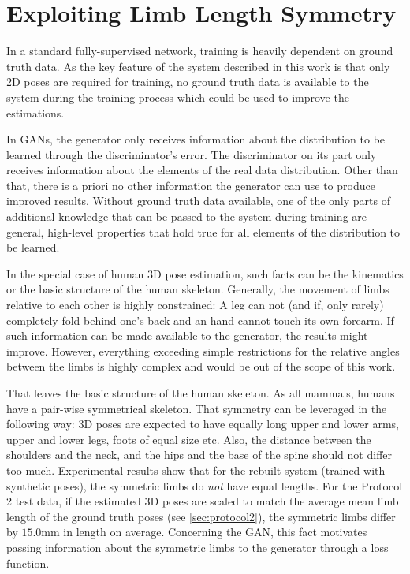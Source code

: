 \section{Exploiting Limb Length Symmetry}
\label{sec:loss-function-modification}

In a standard fully-supervised network, training is heavily dependent on ground truth data.
As the key feature of the system described in this work is that only 2D poses are required for training, no ground truth data is available to the system during the training process which could be used to improve the estimations.

In GANs, the generator only receives information about the distribution to be learned through the discriminator's error.
The discriminator on its part only receives information about the elements of the real data distribution.
Other than that, there is a priori no other information the generator can use to produce improved results.
Without ground truth data available, one of the only parts of additional knowledge that can be passed to the system during training are general, high-level properties that hold true for all elements of the distribution to be learned.

In the special case of human 3D pose estimation, such facts can be the kinematics or the basic structure of the human skeleton.
Generally, the movement of limbs relative to each other is highly constrained:
A leg can not (and if, only rarely) completely fold behind one's back and an hand cannot touch its own forearm.
If such information can be made available to the generator, the results might improve.
However, everything exceeding simple restrictions for the relative angles between the limbs is highly complex and would be out of the scope of this work.

That leaves the basic structure of the human skeleton.
As all mammals, humans have a pair-wise symmetrical skeleton.
That symmetry can be leveraged in the following way:
3D poses are expected to have equally long upper and lower arms, upper and lower legs, foots of equal size etc.
Also, the distance between the shoulders and the neck, and the hips and the base of the spine should not differ too much.
Experimental results show that for the rebuilt system (trained with synthetic poses), the symmetric limbs do \emph{not} have equal lengths.
For the Protocol 2 test data, if the estimated 3D poses are scaled to match the average mean limb length of the ground truth poses (see \autoref{sec:protocol2}), the symmetric limbs differ by $15.0$mm in length on average.
Concerning the GAN, this fact motivates passing information about the symmetric limbs to the generator through a loss function.


